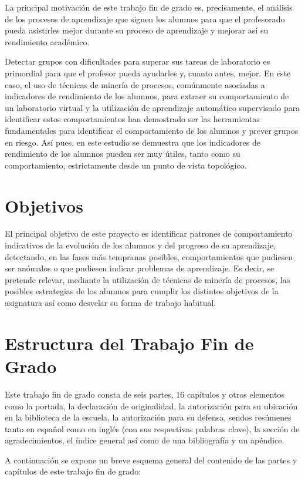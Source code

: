 La principal motivación de este trabajo fin de grado es, precisamente, el análisis de los procesos de aprendizaje que siguen los alumnos para que el profesorado pueda asistirles mejor durante su proceso de aprendizaje y mejorar así su rendimiento académico.

Detectar grupos con dificultades para superar sus tareas de laboratorio es primordial para que el profesor pueda ayudarles y, cuanto antes, mejor. En este caso, el uso de técnicas de minería de procesos, comúnmente asociadas a indicadores de rendimiento de los alumnos, para extraer su comportamiento de un laboratorio virtual y la utilización de aprendizaje automático supervisado para identificar estos comportamientos han demostrado ser las herramientas fundamentales para identificar el comportamiento de los alumnos y prever grupos en riesgo. Así pues, en este estudio se demuestra que los indicadores de rendimiento de los alumnos pueden ser muy útiles, tanto como su comportamiento, estrictamente desde un punto de vista topológico.

\section{Objetivos}

El principal objetivo de este proyecto es identificar patrones de comportamiento indicativos de la evolución de los alumnos y del progreso de su aprendizaje, detectando, en las fases más tempranas posibles, comportamientos que pudiesen ser anómalos o que pudiesen indicar problemas de aprendizaje. Es decir, se pretende relevar, mediante la utilización de técnicas de minería de procesos, las posibles estrategias de los alumnos para cumplir los distintos objetivos de la asignatura así como desvelar su forma de trabajo habitual.

\section{Estructura del Trabajo Fin de Grado}

Este trabajo fin de grado consta de seis partes, $16$ capítulos y otros elementos como la portada, la declaración de originalidad, la autorización para su ubicación en la biblioteca de la escuela, la autorización para su defensa, sendos resúmenes tanto en español como en inglés (con sus respectivas palabras clave), la sección de agradecimientos, el índice general así como de una bibliografía y un apéndice.

A continuación se expone un breve esquema general del contenido de las partes y capítulos de este trabajo fin de grado:

